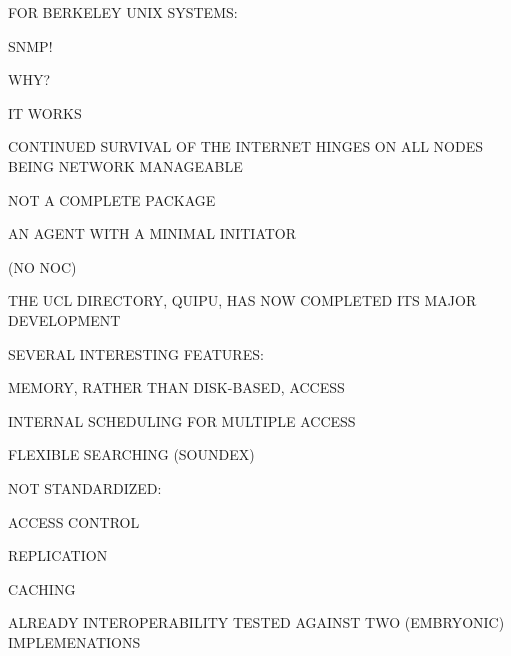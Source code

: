 \begin{bwslide}

\begin{nrtc}
\item	FOR BERKELEY UNIX SYSTEMS:
    \begin{nrtc}
    \item	SNMP!
    \end{nrtc}

\item	WHY?
    \begin{nrtc}
    \item	IT WORKS

    \item	CONTINUED SURVIVAL OF THE INTERNET HINGES ON ALL NODES BEING
		NETWORK MANAGEABLE
    \end{nrtc}

\item	NOT A COMPLETE PACKAGE
    \begin{nrtc}
    \item	AN AGENT WITH A MINIMAL INITIATOR

    \item	(NO NOC)
    \end{nrtc}
\end{nrtc}
\end{bwslide}


\begin{bwslide}

\begin{nrtc}
\item	THE UCL DIRECTORY, QUIPU, HAS NOW COMPLETED ITS MAJOR DEVELOPMENT

\item	SEVERAL INTERESTING FEATURES:
    \begin{nrtc}
    \item	MEMORY, RATHER THAN DISK-BASED, ACCESS

    \item	INTERNAL SCHEDULING FOR MULTIPLE ACCESS

    \item	FLEXIBLE SEARCHING (SOUNDEX)

    \item	NOT STANDARDIZED:
	\begin{nrtc}
	\item	ACCESS CONTROL

	\item	REPLICATION

	\item	CACHING
	\end{nrtc}
    \end{nrtc}

\item	ALREADY INTEROPERABILITY TESTED AGAINST TWO (EMBRYONIC) IMPLEMENATIONS
\end{nrtc}
\end{bwslide}

